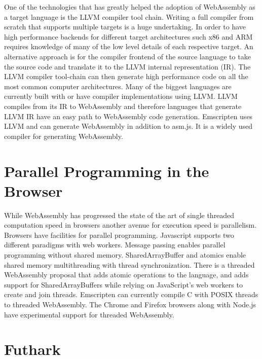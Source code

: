 \documentclass[11pt]{book}
\begin{document}

One of the technologies that has greatly helped the adoption of WebAssembly as a target language is the LLVM \cite{llvm} compiler tool chain. Writing a full compiler from scratch that supports multiple targets is a huge undertaking. In order to have high performance backends for different target architectures such x86 and ARM requires knowledge of many of the low level details of each respective target. An alternative approach is for the compiler frontend of the source language to take the source code and translate it to the LLVM internal representation (IR). The LLVM compiler tool-chain can then generate high performance code on all the most common computer architectures. Many of the biggest languages are currently built with or have compiler implementations using LLVM.
LLVM compiles from its IR to WebAssembly and therefore languages that generate LLVM IR have an easy path to WebAssembly code generation. 
Emscripten uses LLVM and can generate WebAssembly in addition to asm.js. It is a widely used compiler for generating WebAssembly.

\section{Parallel Programming in the Browser}
While WebAssembly has progressed the state of the art of single threaded computation speed in browsers another avenue for execution speed is parallelism. Browsers have facilities for parallel programming. Javascript supports two different paradigms with web workers. Message passing enables parallel programming without shared  memory. SharedArrayBuffer and atomics enable shared memory multithreading with thread synchronization.  There is a threaded WebAssembly proposal that adds atomic operations to the language, and adds support for SharedArrayBuffers while relying on JavaScript’s web workers to create and join threads. Emscripten can currently compile C with POSIX threads to threaded WebAssembly. The Chrome and Firefox browsers along with Node.js have experimental support for threaded WebAssembly.


\section{Futhark}
\end{document}
